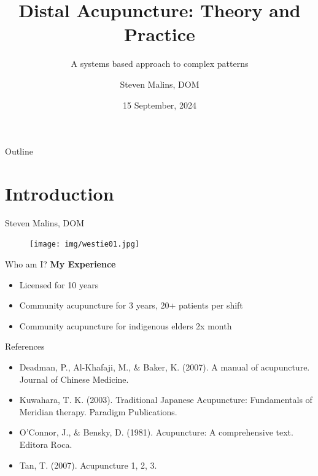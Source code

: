 \usepackage[english]{babel}
\usepackage{pgf}

\usepackage{booktabs}
\usepackage[normalem]{ulem}
\useunder{\uline}{\ul}{}
\setlength{\parskip}{\baselineskip} 

\title[Distal Acupuncture]{Distal Acupuncture: Theory and Practice}
\subtitle{A systems based approach to complex patterns}
\author{Steven Malins, DOM}
\date{15 September, 2024}

\begin{frame}
    \titlepage
\end{frame}

\begin{frame}[allowframebreaks]{Outline}
    \tableofcontents[hideallsubsections]
\end{frame}



\section{Introduction}

\begin{frame}{Steven Malins, DOM}
  \begin{figure}
    \centering
    \texttt{[image: img/westie01.jpg]}
  \end{figure}
\end{frame}

\begin{frame}{Who am I?} %
  \textbf{\Large My Experience}
  \begin{itemize} \itemsep1em
  \item Licensed for 10 years
  \item Community acupuncture for 3 years, 20+ patients per shift
  \item Community acupuncture for indigenous elders 2x month
  \end{itemize}
\end{frame}

\begin{frame}{References}
  \begin{itemize} \itemsep1em
  \item Deadman, P., Al-Khafaji, M., \& Baker, K. (2007). A manual of acupuncture. Journal of Chinese Medicine.
  \item Kuwahara, T. K. (2003). Traditional Japanese Acupuncture: Fundamentals of Meridian therapy. Paradigm Publications.
  \item O'Connor, J., \& Bensky, D. (1981). Acupuncture: A comprehensive text. Editora Roca.
  \item Tan, T. (2007). Acupuncture 1, 2, 3.
  \end{itemize}
\end{frame}

